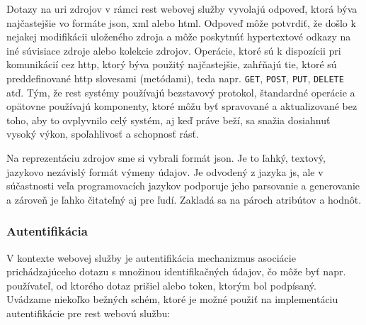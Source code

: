 Dotazy na \acrshort{uri} zdrojov v rámci \acrshort{rest} webovej služby vyvolajú
odpoveď, ktorá býva najčastejšie vo formáte \acrshort{json}, \acrshort{xml}
alebo \acrshort{html}. Odpoveď môže potvrdiť, že došlo k nejakej modifikácii
uloženého zdroja a môže poskytnúť hypertextové odkazy na iné súvisiace zdroje
alebo kolekcie zdrojov. Operácie, ktoré sú k dispozícii pri komunikácií cez
\acrshort{http}, ktorý býva použitý najčastejšie, zahŕňajú tie, ktoré sú
preddefinované \acrshort{http} slovesami (metódami), teda napr. \texttt{GET},
\texttt{POST}, \texttt{PUT}, \texttt{DELETE} atď. Tým, že \acrshort{rest}
systémy používajú bezstavový protokol, štandardné operácie a opätovne používajú
komponenty, ktoré môžu byť spravované a aktualizované bez toho, aby to
ovplyvnilo celý systém, aj keď práve beží, sa snažia dosiahnuť vysoký výkon,
spoľahlivosť a schopnosť rásť. \cite{fielding}

Na reprezentáciu zdrojov sme si vybrali formát \acrfull{json}. Je to ľahký,
textový, jazykovo nezávislý formát výmeny údajov. Je odvodený z jazyka
\acrfull{js}, ale v súčastnosti veľa programovacích jazykov podporuje jeho
parsovanie a generovanie a zároveň je ľahko čitateľný aj pre ľudí. Zakladá sa na
pároch atribútov a hodnôt. \cite{ecma_json}

\subsubsection{Autentifikácia}
\label{subsubsec:auth}

V kontexte webovej služby je autentifikácia mechanizmus asociácie
prichádzajúceho dotazu s množinou identifikačných údajov, čo môže byť napr.
používateľ, od ktorého dotaz prišiel alebo token, ktorým bol podpísaný.
\cite{django_rest_framework} Uvádzame niekoľko bežných schém, ktoré je možné
použiť na implementáciu autentifikácie pre \acrshort{rest} webovú službu:

